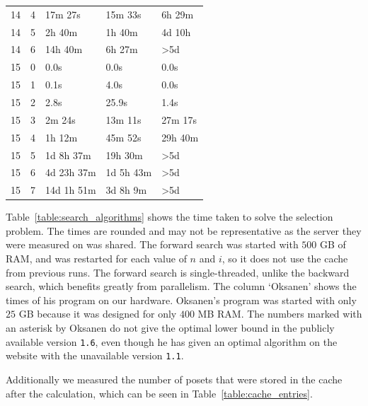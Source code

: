 \documentclass[10pt,journal,compsoc]{IEEEtran}
\begin{document}
\begin{table}[!t]
\begin{tabular}{c|c|l|l|l}
    14  & 4   & 17m 27s                 & 15m 33s                  & 6h 29m           \\
    14  & 5   & 2h 40m                  & 1h 40m                   & 4d 10h           \\
    14  & 6   & 14h 40m                 & 6h 27m                   & >5d              \\
    \hline
    15  & 0   & 0.0s                    & 0.0s                     & 0.0s             \\
    15  & 1   & 0.1s                    & 4.0s                     & 0.0s             \\
    15  & 2   & 2.8s                    & 25.9s                    & 1.4s             \\
    15  & 3   & 2m 24s                  & 13m 11s                  & 27m 17s          \\
    15  & 4   & 1h 12m                  & 45m 52s                  & 29h 40m          \\
    15  & 5   & 1d 8h 37m               & 19h 30m                  & >5d              \\
    15  & 6   & 4d 23h 37m              & 1d 5h 43m                & >5d              \\
    15  & 7   & 14d 1h 51m              & 3d 8h 9m                 & >5d              \\
  \end{tabular}
\end{table}

Table~\ref{table:search_algorithms} shows the time taken to solve the selection problem.
The times are rounded and may not be representative as the server they were measured on was shared.
The forward search was started with $500$ GB of RAM, and was restarted for each value of $n$ and $i$, so it does not use the cache from previous runs.
The forward search is single-threaded, unlike the backward search, which benefits greatly from parallelism.
The column `Oksanen' shows the times of his program \cite{Oksanen} on our hardware.
Oksanen's program was started with only $25$ GB because it was designed for only $400$ MB RAM.
The numbers marked with an asterisk by Oksanen do not give the optimal lower bound in the publicly available version \texttt{1.6}, even though he has given an optimal algorithm on the website with the unavailable version \texttt{1.1}.

Additionally we measured the number of posets that were stored in the cache after the calculation, which can be seen in Table~\ref{table:cache_entries}.
\end{document}
